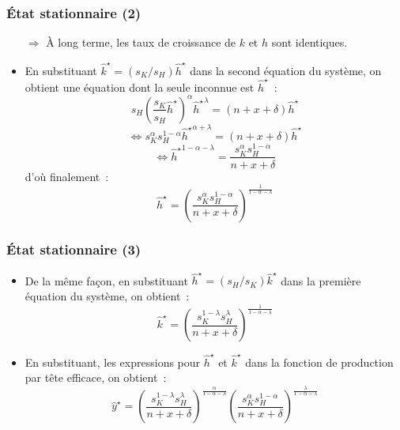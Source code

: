 \documentclass[10pt,notheorems]{beamer}
\theoremstyle{plain}
\theoremstyle{definition} %
\begin{document}
\begin{frame}
  \frametitle{État stationnaire (2)}

  \begin{itemize}

    \item[$\Rightarrow$] À long terme, les taux de croissance de $k$ et $h$ sont identiques.\newline

    \item En substituant $\hat k^\star = (s_K/s_H)\hat h^\star$ dans la second équation du système, on obtient une équation dont la seule inconnue est $\hat h^\star$~:
      \[
        s_H \left( \frac{s_K}{s_H} \hat h^\star\right)^{\alpha}\left. \hat h^\star\right.^{\lambda} = (n+x+\delta)\hat h^\star
      \]
      \medskip
      \[
        \Leftrightarrow s_K^\alpha s_H^{1-\alpha} \left. \hat h^\star\right.^{\alpha+\lambda} = (n+x+\delta)\hat h^\star
      \]
      \medskip
      \[
        \Leftrightarrow \left. \hat h^\star\right.^{1-\alpha-\lambda} = \frac{s_K^\alpha s_H^{1-\alpha}}{n+x+\delta}
      \]
      \medskip
      d'où finalement~:
      \medskip
      \[
        \hat h^\star = \left(\frac{s_K^\alpha s_H^{1-\alpha}}{n+x+\delta}\right)^{\frac{1}{1-\alpha-\lambda}}
      \]

  \end{itemize}

\end{frame}



\begin{frame}
  \frametitle{État stationnaire (3)}

  \begin{itemize}

    \item De la même façon, en substituant $\hat h^\star = (s_H/s_K)\hat k^\star$ dans la première équation du système, on obtient~:
      \medskip
      \[
        \hat k^\star = \left(\frac{s_K^{1-\lambda} s_H^{\lambda}}{n+x+\delta}\right)^{\frac{1}{1-\alpha-\lambda}}
      \]
      \medskip

    \item En substituant, les expressions pour $\hat h^{\star}$ et $\hat k^{\star}$ dans la fonction de production par tête efficace, on obtient~:
      \[
        \hat y^{\star} = \left(\frac{s_K^{1-\lambda} s_H^{\lambda}}{n+x+\delta}\right)^{\frac{\alpha}{1-\alpha-\lambda}}
        \left(\frac{s_K^\alpha s_H^{1-\alpha}}{n+x+\delta}\right)^{\frac{\lambda}{1-\alpha-\lambda}}
      \]

  \end{itemize}

\end{frame}
\end{document}
